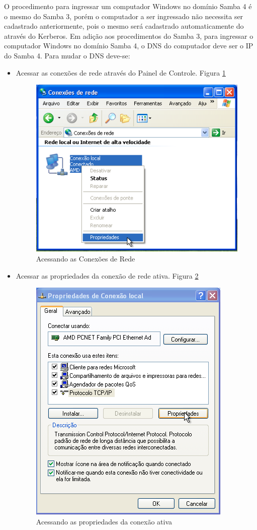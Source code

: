 O procedimento para ingressar um computador Windows no domínio Samba 4 é o mesmo do Samba 3, porém o computador a ser ingressado não necessita ser cadastrado anteriormente, pois o mesmo será cadastrado automaticamente do através do Kerberos.
Em adição aos procedimentos do Samba 3, para ingressar o computador Windows no domínio Samba 4, o DNS do computador deve ser o IP do Samba 4. Para mudar o DNS deve-se:
\begin{itemize}
	\item Acessar as conexões de rede através do Painel de Controle. Figura \ref{conexoes_rede}
	\begin{figure}[h!]
			\centering
	 		\includegraphics[width=0.5 \textwidth]{figuras/conexoes_rede}
			\caption{Acessando as Conexões de Rede}
			\label{conexoes_rede}
	\end{figure}	
	\item Acessar as propriedades da conexão de rede ativa. Figura \ref{propriedades_conexao}
	\begin{figure}[h!]
			\centering
	 		\includegraphics[width=0.4 \textwidth]{figuras/propriedades_conexao}
			\caption{Acessando as propriedades da conexão ativa}
			\label{propriedades_conexao}
	\end{figure}
	
	\pagebreak
	

\end{itemize}
